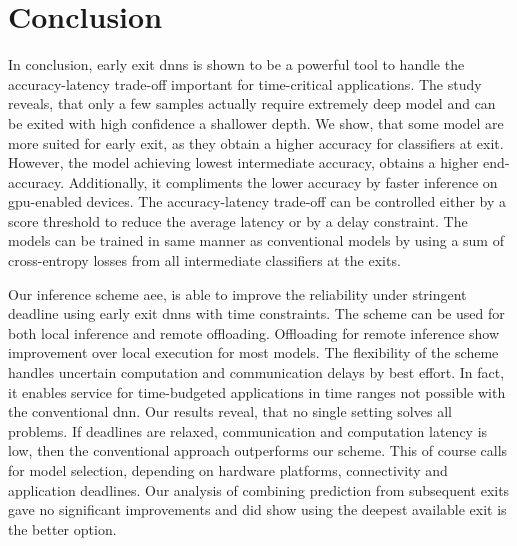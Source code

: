 \hypertarget{conclusion}{%
\chapter{Conclusion}\label{ch:conclusion}}


In conclusion, early exit \gls{dnn}s is shown to be a powerful tool to handle the accuracy-latency trade-off important for time-critical applications. The study reveals, that only a few samples actually require extremely deep model and can be exited with high confidence a shallower depth. We show, that some model are more suited for early exit, as they obtain a higher accuracy for classifiers at exit. However, the model achieving lowest intermediate accuracy, obtains a higher end-accuracy. Additionally, it compliments the lower accuracy by faster inference on \gls{gpu}-enabled devices. The accuracy-latency trade-off can be controlled either by a score threshold to reduce the average latency or by a delay constraint. The models can be trained in same manner as conventional models by using a sum of cross-entropy losses from all intermediate classifiers at the exits.

Our inference scheme \gls{aee}, is able to improve the reliability under stringent deadline using early exit \gls{dnn}s with time constraints. The scheme can be used for both local inference and remote offloading. Offloading for remote inference show improvement over local execution for most models. The flexibility of the scheme handles uncertain computation and communication delays by best effort. In fact, it enables service for time-budgeted applications in time ranges not possible with the conventional \gls{dnn}. Our results reveal, that no single setting solves all problems. If deadlines are relaxed, communication and computation latency is low, then the conventional approach outperforms our scheme. This of course calls for model selection, depending on hardware platforms, connectivity and application deadlines. Our analysis of combining prediction from subsequent exits gave no significant improvements and did show using the deepest available exit is the better option.


